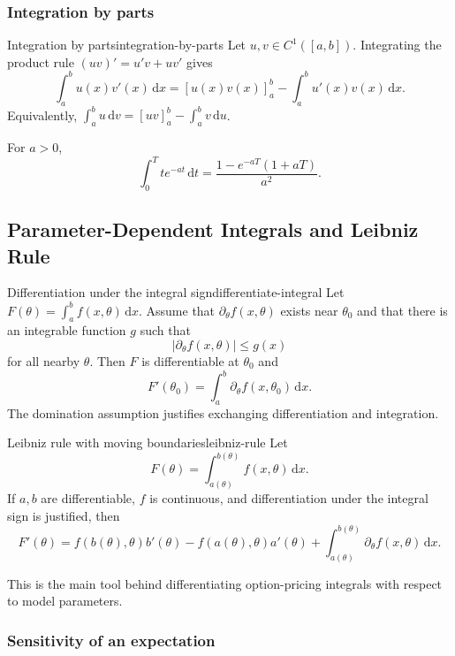 \documentclass[11pt]{article}
\newcommand{\dd}{\,\mathrm{d}}
\theoremstyle{definition}
\theoremstyle{plain}
\theoremstyle{remark}
\begin{document}
\subsubsection*{Integration by parts}

\begin{keyproposition}{Integration by parts}{integration-by-parts}
Let $u,v\in C^1([a,b])$. Integrating the product rule
$(uv)'=u'v+uv'$ gives
\[
\boxed{
\int_a^b u(x)v'(x)\dd x
=\left[u(x)v(x)\right]_a^b
-\int_a^b u'(x)v(x)\dd x.}
\]
Equivalently, $\int_a^b u\dd v=[uv]_a^b-\int_a^b v\dd u$.
\end{keyproposition}

For $a>0$,
\[
\int_0^T te^{-at}\dd t
=
\frac{1-e^{-aT}(1+aT)}{a^2}.
\]

\clearpage
\subsection{Parameter-Dependent Integrals and Leibniz Rule}

\begin{keyproposition}{Differentiation under the integral sign}{differentiate-integral}
Let $F(\theta)=\int_a^b f(x,\theta)\dd x$. Assume that
$\partial_\theta f(x,\theta)$ exists near $\theta_0$ and that there is an
integrable function $g$ such that
\[
|\partial_\theta f(x,\theta)|\leq g(x)
\]
for all nearby $\theta$. Then $F$ is differentiable at $\theta_0$ and
\[
\boxed{
F'(\theta_0)=\int_a^b\partial_\theta f(x,\theta_0)\dd x.}
\]
The domination assumption justifies exchanging differentiation and integration.
\end{keyproposition}

\begin{keyproposition}{Leibniz rule with moving boundaries}{leibniz-rule}
Let
\[
F(\theta)=\int_{a(\theta)}^{b(\theta)} f(x,\theta)\dd x.
\]
If $a,b$ are differentiable, $f$ is continuous, and differentiation under the
integral sign is justified, then
\[
\boxed{
F'(\theta)
=
f(b(\theta),\theta)b'(\theta)
-f(a(\theta),\theta)a'(\theta)
+\int_{a(\theta)}^{b(\theta)}
\partial_\theta f(x,\theta)\dd x.}
\]
\end{keyproposition}

This is the main tool behind differentiating option-pricing integrals with
respect to model parameters.

\subsubsection*{Sensitivity of an expectation}
\end{document}

